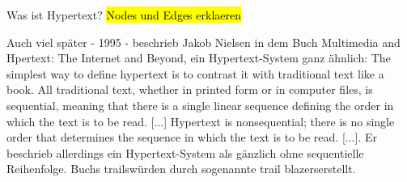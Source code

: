 \begin{section}{Was ist Hypertext?}
\hl{Nodes und Edges erklaeren }\cite{Conklin1987}

Auch viel später - 1995 - beschrieb Jakob Nielsen in dem Buch Multimedia and Hpertext: The Internet and Beyond, ein Hypertext-System ganz ähnlich: \glqq The simplest way to define hypertext is to contrast it with traditional text like a book. All traditional text, whether in printed form or in computer files, is sequential, meaning that there is a single linear sequence defining the order in which the text is to be read. [...] Hypertext is nonsequential; there is no single order that determines the sequence in which the text is to be read. [...]\grqq{ }\cite[S.1]{Nielsen1995}. Er beschrieb allerdings ein Hypertext-System als gänzlich ohne sequentielle Reihenfolge. Buchs \glqq trails\grqq{ }würden durch sogenannte \glqq trail blazers\grqq{ }erstellt\cite[S.35]{Nielsen1995}.

\end{section}
